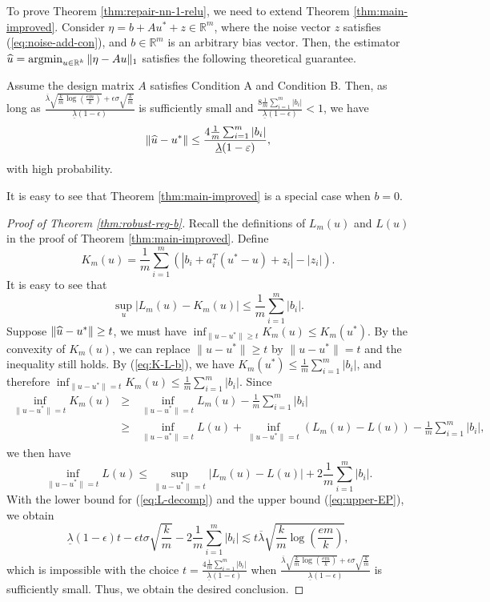 To prove Theorem \ref{thm:repair-nn-1-relu}, we need to extend Theorem \ref{thm:main-improved}. Consider $\eta=b+Au^*+z\in\mathbb{R}^m$, where the noise vector $z$ satisfies (\ref{eq:noise-add-con}), and $b\in\mathbb{R}^m$ is an arbitrary bias vector. Then, the estimator $\widehat{u}=\mathop{\rm argmin}_{u\in\mathbb{R}^k}\|\eta-Au\|_1$ satisfies the following theoretical guarantee.
\begin{thm}\label{thm:robust-reg-b}
Assume the design matrix $A$ satisfies Condition A and Condition B. Then, as long as $\frac{\overline{\lambda}\sqrt{\frac{k}{m}\log\left(\frac{em}{k}\right)}+\epsilon\sigma\sqrt{\frac{k}{m}}}{\underline{\lambda}(1-\epsilon)}$ is sufficiently small and $\frac{8\frac{1}{m}\sum_{i=1}^m|b_i|}{\underline{\lambda}(1-\epsilon)}<1$, we have
$$\|\widehat{u}-u^*\|\leq \frac{4\frac{1}{m}\sum_{i=1}^m|b_i|}{\underline{\lambda}(1-\varepsilon)},$$
with high probability.
\end{thm}
It is easy to see that Theorem \ref{thm:main-improved} is a special case when $b=0$.
\begin{proof}[Proof of Theorem \ref{thm:robust-reg-b}]
Recall the definitions of $L_m(u)$ and $L(u)$ in the proof of Theorem \ref{thm:main-improved}. Define
$$K_m(u)=\frac{1}{m}\sum_{i=1}^m\left(|b_i+a_i^T(u^*-u)+z_i|-|z_i|\right).$$
It is easy to see that
\begin{equation}
\sup_u|L_m(u)-K_m(u)|\leq \frac{1}{m}\sum_{i=1}^m|b_i|.\label{eq:K-L-b}
\end{equation}
Suppose $\|\widehat{u}-u^*\|\geq t$, we must have $\inf_{\|u-u^*\|\geq t}K_m(u) \leq K_m(u^*)$.
By the convexity of $K_m(u)$, we can replace $\|u-u^*\|\geq t$ by $\|u-u^*\| = t$ and the inequality still holds. By (\ref{eq:K-L-b}), we have $K_m(u^*)\leq \frac{1}{m}\sum_{i=1}^m|b_i|$, and therefore $\inf_{\|u-u^*\|= t}K_m(u)\leq \frac{1}{m}\sum_{i=1}^m|b_i|$. Since
\begin{eqnarray*}
\inf_{\|u-u^*\|= t}K_m(u) &\geq& \inf_{\|u-u^*\|= t}L_m(u) - \frac{1}{m}\sum_{i=1}^m|b_i| \\
&\geq& \inf_{\|u-u^*\|=t}L(u) + \inf_{\|u-u^*\|= t}(L_m(u)-L(u)) - \frac{1}{m}\sum_{i=1}^m|b_i|,
\end{eqnarray*}
we then have
\begin{equation}
\inf_{\|u-u^*\|=t}L(u) \leq \sup_{\|u-u^*\|= t}|L_m(u)-L(u)| + 2\frac{1}{m}\sum_{i=1}^m|b_i|. %
\end{equation}
With the lower bound for (\ref{eq:L-decomp}) and the upper bound (\ref{eq:upper-EP}), we obtain
$$\underline{\lambda}(1-\epsilon)t - \epsilon t\sigma\sqrt{\frac{k}{m}} - 2\frac{1}{m}\sum_{i=1}^m|b_i|\lesssim t\overline{\lambda}\sqrt{\frac{k}{m}\log\left(\frac{em}{k}\right)},$$
which is impossible with the choice $t=\frac{4\frac{1}{m}\sum_{i=1}^m|b_i|}{\underline{\lambda}(1-\epsilon)}$ when $\frac{\overline{\lambda}\sqrt{\frac{k}{m}\log\left(\frac{em}{k}\right)}+\epsilon\sigma\sqrt{\frac{k}{m}}}{\underline{\lambda}(1-\epsilon)}$ is sufficiently small. Thus, we obtain the desired conclusion.
\end{proof}

